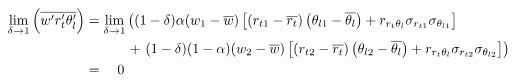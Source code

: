 \begin{align}
    \label{eq:limit_wprimertprimethetalbar_delta_to_1}
    \lim_{\delta \to 1}\left(\overline{w' r_t' \theta_l'}\right)
    &= \lim_{\delta \to 1}
    \left(
    (1 - \delta) \alpha (w_1 - \overline{w}) \left[
        \left(r_{t1} - \overline{r_t}\right)
        \left(\theta_{l1} - \overline{\theta_l}\right) +
        r_{r_t \theta_l} \sigma_{r_{t1}} \sigma_{\theta_{l1}}
        \right] \right.\nonumber\\
    &\quad\quad\quad+ \left.(1 - \delta) (1 - \alpha) (w_2 - \overline{w}) \left[
        \left(r_{t2} - \overline{r_t}\right)
        \left(\theta_{l2} - \overline{\theta_l}\right) +
        r_{r_t \theta_l} \sigma_{r_{t2}} \sigma_{\theta_{l2}}
        \right]
    \right) \nonumber\\
    &=\quad 0
\end{align}